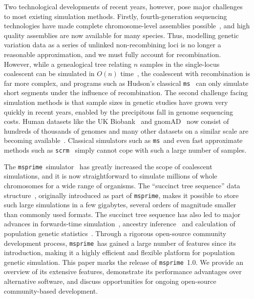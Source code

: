 \documentclass{article}
\newcommand{\msprime}[0]{\texttt{msprime}}
\newcommand{\ms}[0]{\texttt{ms}}
\newcommand{\scrm}[0]{\texttt{scrm}}
\begin{document}
Two technological developments of recent years, however,
pose major challenges to most existing simulation methods.
Firstly, fourth-generation sequencing technologies have made
complete chromosome-level assemblies possible~\citep{miga2020telomere},
and high quality assemblies are now available for many species.
Thus, modelling genetic variation data as a series of unlinked
non-recombining loci
is no longer a reasonable approximation, and
we must fully account for recombination.
However, while a genealogical tree relating $n$ samples in the single-locus coalescent
can be simulated in $O(n)$ time~\citep{hudson1990gene},
the coalescent with recombination is far more complex,
and programs such as
Hudson's classical \ms~\citep{hudson2002generating}
can only simulate short segments under the influence of recombination.
The second challenge facing simulation methods is that
sample sizes in genetic studies have grown very quickly
in recent years, enabled by the precipitous fall in genome sequencing costs.
Human datasets like the
UK Biobank~\citep{bycroft2018genome} and
gnomAD~\citep{karczewski2020mutational} now consist of hundreds of
thousands of genomes and many other datasets on a similar scale
are becoming available~\citep{tanjo2021practical}.
Classical simulators such as \ms\ and even fast approximate methods
such as \scrm~\citep{staab2015scrm} simply cannot
cope with such a large number of samples.

The \msprime\ simulator~\citep{kelleher2016efficient,kelleher2020coalescent}
has greatly increased the scope of coalescent simulations,
and it is now straightforward to simulate millions of whole chromosomes
for a wide range of organisms.
The ``succinct tree sequence'' data
structure~\citep{kelleher2016efficient,kelleher2018efficient,kelleher2019inferring,
wohns2021unified},
originally introduced as part of \msprime, makes it possible to store
such large simulations in a few gigabytes, several orders
of magnitude smaller than commonly used formats.
The succinct tree sequence has also led to major advances in forwards-time
simulation~\citep{kelleher2018efficient,haller2018tree},
ancestry inference~\citep{kelleher2019inferring,wohns2021unified}
and calculation of population genetic
statistics~\citep{kelleher2016efficient,ralph2020efficiently}.
Through a rigorous open-source community development process,
\msprime\ has gained a large number of features since its introduction,
making it a highly efficient and flexible platform for population
genetic simulation.
This paper marks the release of \msprime\ 1.0.
We provide an overview of its extensive features,
demonstrate its performance advantages over alternative software,
and discuss opportunities for ongoing
open-source community-based development.
\end{document}
